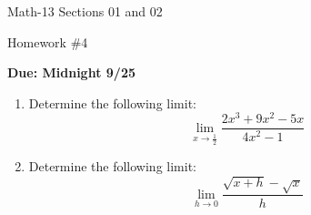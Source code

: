 \documentclass[letterpaper,12pt,fleqn]{article}
\begin{document}
\begin{center}
  \large
  Math-13 Sections 01 and 02

  \Large
  Homework \#4

  \large
  \textbf{Due: Midnight 9/25}
\end{center}

\begin{enumerate}
\item Determine the following limit:
  \[\lim_{x\to\frac{1}{2}}\frac{2x^3+9x^2-5x}{4x^2-1}\]

\item Determine the following limit:
  \[\lim_{h\to0}\frac{\sqrt{x+h}-\sqrt{x}}{h}\]
\end{enumerate}
\end{document}
